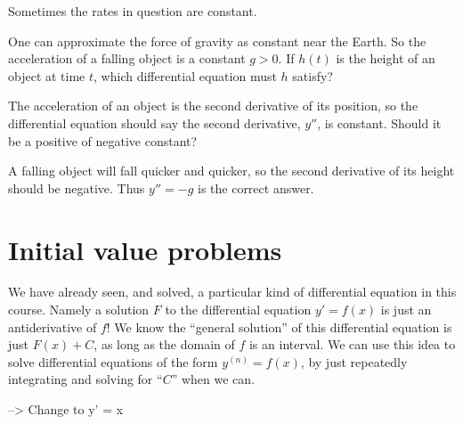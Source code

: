 \documentclass{ximera}
\begin{document}
Sometimes the rates in question are constant. 



\begin{question}
  One can approximate the force of gravity as constant near the Earth.
  So the acceleration of a falling object is a constant $g>0$.  If
  $h(t)$ is the height of an object at time $t$, which differential
  equation must $h$ satisfy?
  \begin{multipleChoice}
  \end{multipleChoice}
  
  \begin{hint}
    The acceleration of an object is the second derivative of its
    position, so the differential equation should say the second
    derivative, $y''$, is constant.  Should it be a positive of
    negative constant?
  \end{hint}
  \begin{hint}
    A falling object will fall quicker and quicker, so the second
    derivative of its height should be negative.  Thus $y''=-g$ is the
    correct answer.
  \end{hint}	
\end{question}


















\section{Initial value problems}


We have already seen, and solved, a particular kind of differential
equation in this course.  Namely a solution $F$ to the differential
equation $y' = f(x)$ is just an antiderivative of $f$!  We know the
``general solution'' of this differential equation is just $F(x)+C$,
as long as the domain of $f$ is an interval.  We can use this idea to
solve differential equations of the form $y^{(n)} = f(x)$, by just
repeatedly integrating and solving for ``$C$'' when we can.






-->  Change to y' = x
\end{document}
